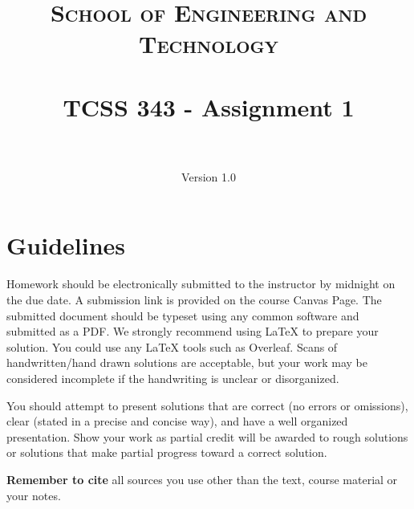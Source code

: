\documentclass[paper=a4, fontsize=11pt]{scrartcl}
\title{
		\usefont{OT1}{bch}{b}{n}
		\normalfont \normalsize \textsc{School of Engineering and Technology} \\ [25pt]
		\horrule{0.5pt} \\[0.4cm]
		\huge TCSS 343 - Assignment 1\\
		\horrule{2pt} \\[0.5cm]
}
\author{
		\normalfont 								\normalsize
        Version 1.0\\[-3pt]
}
\numberwithin{equation}{section}		%
\numberwithin{figure}{section}			%
\numberwithin{table}{section}				%
\begin{document}
\maketitle

\section{Guidelines}
Homework should be electronically submitted to the instructor by midnight on the due date.  A submission link is provided on the course Canvas Page.  The submitted document should be typeset using any common software and submitted as a PDF.  We strongly recommend using \LaTeX\;  to prepare your solution.  You could use any \LaTeX\; tools such as Overleaf. Scans of handwritten/hand drawn solutions are acceptable, but your work may be considered incomplete if the handwriting is unclear or disorganized.

You should attempt to present solutions that are correct (no errors or omissions), clear (stated in a precise and concise way), and have a well organized presentation.  Show your work as partial credit will be awarded to rough solutions or solutions that make partial progress toward a correct solution.

\textbf{Remember to cite} all sources you use other than the text, course material or your notes.

\newpage
\end{document}
